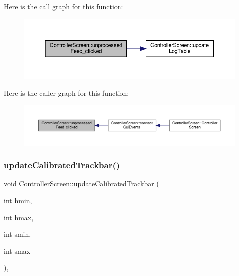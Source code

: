 Here is the call graph for this function\+:
\nopagebreak
\begin{figure}[H]
\begin{center}
\leavevmode
\includegraphics[width=350pt]{class_controller_screen_aac8b2856372fa02c4f793cf9183dffed_cgraph}
\end{center}
\end{figure}
Here is the caller graph for this function\+:
\nopagebreak
\begin{figure}[H]
\begin{center}
\leavevmode
\includegraphics[width=350pt]{class_controller_screen_aac8b2856372fa02c4f793cf9183dffed_icgraph}
\end{center}
\end{figure}
\mbox{\label{class_controller_screen_a700c8c1911e68861b86890a5429d2692}} 
\subsubsection{\texorpdfstring{update\+Calibrated\+Trackbar()}{updateCalibratedTrackbar()}}
{\footnotesize\ttfamily void Controller\+Screen\+::update\+Calibrated\+Trackbar (\begin{DoxyParamCaption}\item[{int}]{hmin,  }\item[{int}]{hmax,  }\item[{int}]{smin,  }\item[{int}]{smax }\end{DoxyParamCaption})\hspace{0.3cm}{\ttfamily [override]}, {\ttfamily [virtual]}}

